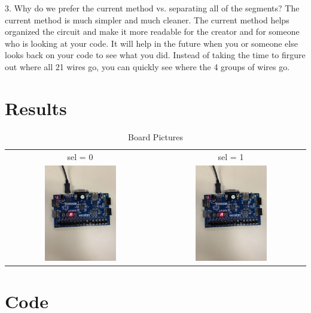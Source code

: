 \documentclass[11pt]{article}
\begin{document}
3. Why do we prefer the current method vs. separating all of the segments? \newline
The current method is much simpler and much cleaner. The current method helps organized the circuit and make it more readable for the creator and for someone who is looking at your code. It will help in the future when you or someone else looks back on your code to see what you did. Instead of taking the time to firgure out where all 21 wires go, you can quickly see where the 4 groups of wires go. \newline


\section*{Results}

\begin{table}[h]\centering
	\begin{tabular}{cc}
		sel = 0 & sel = 1 \\
		\includegraphics [width=0.5\textwidth,trim=0 0 0 0, clip, angle = 270]{Basys3_pic1} &
		\includegraphics [width=0.5\textwidth,trim=0 0 0 0, clip, angle = 270]{Basys3_pic2} \\
	\end{tabular}
	\caption{Board Pictures}
	\label{fig:sim_with_table}
\end{table}




\section*{Code}
\end{document}
